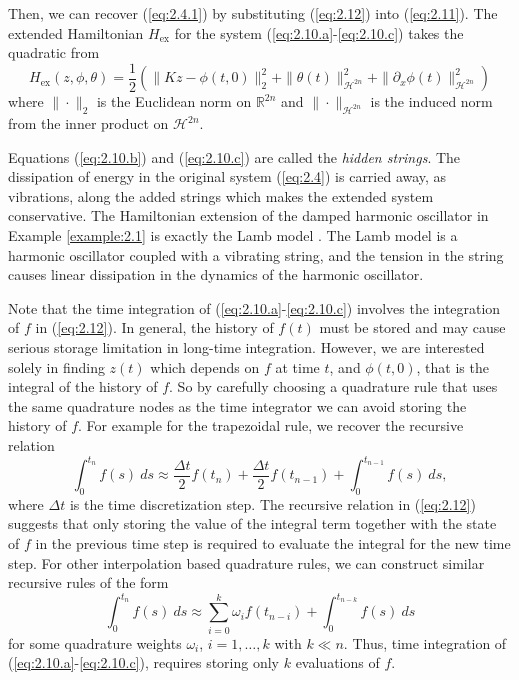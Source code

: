 Then, we can recover (\ref{eq:2.4.1}) by substituting (\ref{eq:2.12}) into (\ref{eq:2.11}). The extended Hamiltonian $H_\text{ex}$ for the system (\ref{eq:2.10.a}-\ref{eq:2.10.c}) takes the quadratic from
\begin{equation} \label{eq:2.13}
	H_\text{ex}(z,\phi,\theta) = \frac 1 2 \left( \| Kz - \phi(t,0) \|_2^2 + \| \theta(t) \|^2_{\mathcal H^{2n} } + \| \partial_x\phi(t)\|^2_{\mathcal H^{2n} }\right)
\end{equation}
where $\| \cdot \|_2$ is the Euclidean norm on $\mathbb R^{2n}$ and $\| \cdot \|_{\mathcal H^{2n}}$ is the induced norm from the inner product on $\mathcal H^{2n}$. 

Equations (\ref{eq:2.10.b}) and (\ref{eq:2.10.c}) are called the \emph{hidden strings}. The dissipation of energy in the original system (\ref{eq:2.4}) is carried away, as vibrations, along the added strings which makes the extended system conservative. The Hamiltonian extension of the damped harmonic oscillator in Example \ref{example:2.1} is exactly the Lamb model \cite{lamb:1900}. The Lamb model is a harmonic oscillator coupled with a vibrating string, and the tension in the string causes linear dissipation in the dynamics of the harmonic oscillator.

Note that the time integration of (\ref{eq:2.10.a}-\ref{eq:2.10.c}) involves the integration of $f$ in (\ref{eq:2.12}). In general, the history of $f(t)$ must be stored and may cause serious storage limitation in long-time integration. However, we are interested solely in finding $z(t)$ which depends on $f$ at time $t$, and $\phi(t,0)$, that is the integral of the history of $f$. So by carefully choosing a quadrature rule that uses the same quadrature nodes as the time integrator we can avoid storing the history of $f$. For example for the trapezoidal rule, we recover the recursive relation
\begin{equation} \label{eq:2.14}
	\int_{0}^{t_n} f(s) \ ds \approx \frac{\Delta t}{2} f(t_n) + \frac{\Delta t}{2} f(t_{n-1}) + \int_{0}^{t_{n-1}} f(s) \ ds,
\end{equation}
where $\Delta t$ is the time discretization step. The recursive relation in (\ref{eq:2.12}) suggests that only storing the value of the integral term together with the state of $f$ in the previous time step is required to evaluate the integral for the new time step. For other interpolation based quadrature rules, we can construct similar recursive rules of the form
\begin{equation}
	\int_{0}^{t_n} f(s) \ ds \approx \sum_{i=0}^{k} \omega_i f(t_{n-i})  + \int_{0}^{t_{n-k}} f(s) \ ds
\end{equation}
for some quadrature weights $\omega_i$, $i=1,\dots,k$ with $k\ll n$. Thus, time integration of (\ref{eq:2.10.a}-\ref{eq:2.10.c}), requires storing only $k$ evaluations of $f$.
